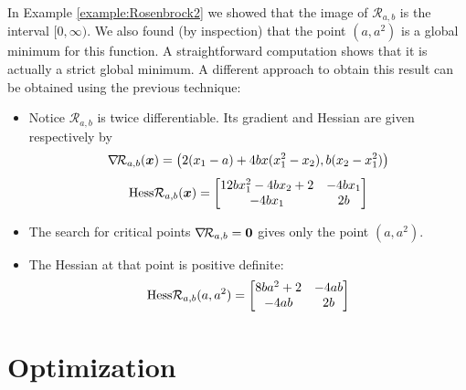 


\begin{example}
In Example \ref{example:Rosenbrock2} we showed that the image of $\mathcal{R}_{a,b}$ is the interval $[0,\infty)$.  We also found (by inspection) that the point $(a,a^2)$ is a global minimum for this function. A straightforward computation shows that it is actually a strict global minimum.  A different approach to obtain this result can be obtained using the previous technique:
\begin{itemize}
	\item Notice $\mathcal{R}_{a,b}$ is twice differentiable.  Its gradient and Hessian are given respectively by
	\begin{equation*}
	\mathop{\nabla\! {\mathcal{R}_{a,b}}}(\boldsymbol{x}) = \big( 2(x_1-a) +4bx(x_1^2-x_2) , b(x_2-x_1^2) \big) \\
	\end{equation*}
	\begin{equation*}
	\mathop{\mathrm{Hess}{\mathcal{R}_{a,b}}}(\boldsymbol{x}) = \begin{bmatrix}
	12bx_1^2-4bx_2+2 & -4bx_1 \\
	-4bx_1 & 2b
	\end{bmatrix}
	\end{equation*}
	\item The search for critical points $\mathop{\nabla\! {\mathcal{R}_{a,b}}} = \boldsymbol{0}$ gives only the point $(a,a^2)$.
	\item The Hessian at that point is positive definite:
	\begin{equation*}
	\mathop{\mathrm{Hess}{\mathcal{R}_{a,b}}}(a,a^2) = \begin{bmatrix}
	8ba^2+2 & -4ab \\
	-4ab & 2b
	\end{bmatrix}
	\end{equation*}
\end{itemize}
\end{example}

\section{Optimization}


